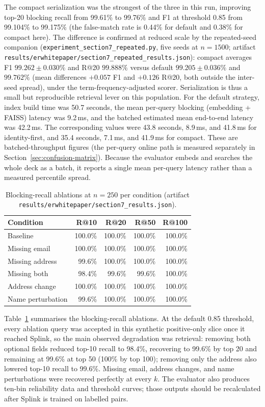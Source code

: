 \documentclass[11pt]{article}
\begin{document}
The compact serialization was the strongest of the three in this run, improving top-20 blocking recall from 99.61\% to 99.76\% and F1 at threshold 0.85 from 99.104\% to 99.175\% (the false-match rate is 0.44\% for default and 0.38\% for compact here). The difference is confirmed at reduced scale by the repeated-seed companion (\texttt{experiment\_section7\_repeated.py}, five seeds at $n{=}1500$; artifact \texttt{results/erwhitepaper/section7\_repeated\_results.json}): compact averages F1 $99.262 \pm 0.030\%$ and R@20 $99.888\%$ versus default $99.205 \pm 0.036\%$ and $99.762\%$ (mean differences $+0.057$ F1 and $+0.126$ R@20, both outside the inter-seed spread), under the term-frequency-adjusted scorer. Serialization is thus a small but reproducible retrieval lever on this population. For the default strategy, index build time was 50.7 seconds, the mean per-query blocking (embedding + FAISS) latency was 9.2\,ms, and the batched estimated mean end-to-end latency was 42.2\,ms. The corresponding values were 43.8 seconds, 8.9\,ms, and 41.8\,ms for identity-first, and 35.4 seconds, 7.1\,ms, and 41.9\,ms for compact. These are batched-throughput figures (the per-query online path is measured separately in Section~\ref{sec:confusion-matrix}). Because the evaluator embeds and searches the whole deck as a batch, it reports a single mean per-query latency rather than a measured percentile spread.

\begin{table}[h]
\centering
\caption{Blocking-recall ablations at $n=250$ per condition (artifact \texttt{results/erwhitepaper/section7\_results.json}).}
\label{tab:section7-ablations}
\small
\begin{tabular}{lrrrr}
\toprule
Condition & R@10 & R@20 & R@50 & R@100 \\
\midrule
Baseline & 100.0\% & 100.0\% & 100.0\% & 100.0\% \\
Missing email & 100.0\% & 100.0\% & 100.0\% & 100.0\% \\
Missing address & 99.6\% & 100.0\% & 100.0\% & 100.0\% \\
Missing both & 98.4\% & 99.6\% & 99.6\% & 100.0\% \\
Address change & 100.0\% & 100.0\% & 100.0\% & 100.0\% \\
Name perturbation & 99.6\% & 100.0\% & 100.0\% & 100.0\% \\
\bottomrule
\end{tabular}
\end{table}

Table~\ref{tab:section7-ablations} summarises the blocking-recall ablations. At the default 0.85 threshold, every ablation query was accepted in this synthetic positive-only slice once it reached Splink, so the main observed degradation was retrieval: removing both optional fields reduced top-10 recall to 98.4\%, recovering to 99.6\% by top 20 and remaining at 99.6\% at top 50 (100\% by top 100); removing only the address also lowered top-10 recall to 99.6\%. Missing email, address changes, and name perturbations were recovered perfectly at every $k$. The evaluator also produces ten-bin reliability data and threshold curves; those outputs should be recalculated after Splink is trained on labelled pairs.
\end{document}
